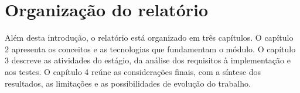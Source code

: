 \section{Organização do relatório}
\label{sec:organizacao-relatorio}

Além desta introdução, o relatório está organizado 
em três capítulos. O capítulo 2 apresenta os conceitos e 
as tecnologias que fundamentam o módulo. O capítulo 3 descreve as 
atividades do estágio, da análise dos requisitos à implementação e 
aos testes. O capítulo 4 reúne as considerações finais, com a 
síntese dos resultados, as limitações e as possibilidades de 
evolução do trabalho.
